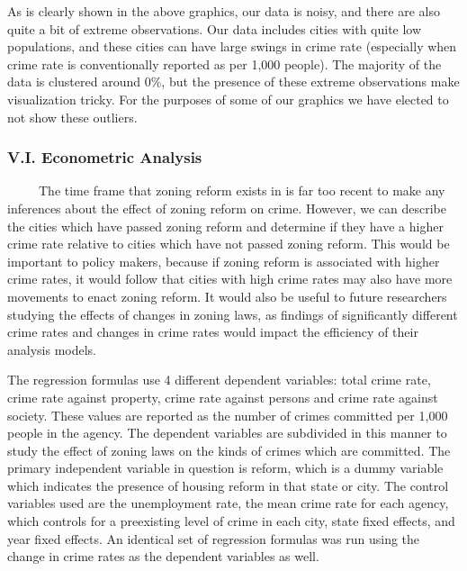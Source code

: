\documentclass[
  12pt,
]{article}
\begin{document}
As is clearly shown in the above graphics, our data is noisy, and there
are also quite a bit of extreme observations. Our data includes cities
with quite low populations, and these cities can have large swings in
crime rate (especially when crime rate is conventionally reported as per
1,000 people). The majority of the data is clustered around 0\%, but the
presence of these extreme observations make visualization tricky. For
the purposes of some of our graphics we have elected to not show these
outliers.

\hypertarget{v.i.-econometric-analysis}{%
\subsubsection{V.I. Econometric
Analysis}\label{v.i.-econometric-analysis}}

\setlength\parindent{24pt}

~~~~~The time frame that zoning reform exists in is far too recent to
make any inferences about the effect of zoning reform on crime. However,
we can describe the cities which have passed zoning reform and determine
if they have a higher crime rate relative to cities which have not
passed zoning reform. This would be important to policy makers, because
if zoning reform is associated with higher crime rates, it would follow
that cities with high crime rates may also have more movements to enact
zoning reform. It would also be useful to future researchers studying
the effects of changes in zoning laws, as findings of significantly
different crime rates and changes in crime rates would impact the
efficiency of their analysis models.

The regression formulas use 4 different dependent variables: total crime
rate, crime rate against property, crime rate against persons and crime
rate against society. These values are reported as the number of crimes
committed per 1,000 people in the agency. The dependent variables are
subdivided in this manner to study the effect of zoning laws on the
kinds of crimes which are committed. The primary independent variable in
question is reform, which is a dummy variable which indicates the
presence of housing reform in that state or city. The control variables
used are the unemployment rate, the mean crime rate for each agency,
which controls for a preexisting level of crime in each city, state
fixed effects, and year fixed effects. An identical set of regression
formulas was run using the change in crime rates as the dependent
variables as well.
\end{document}
